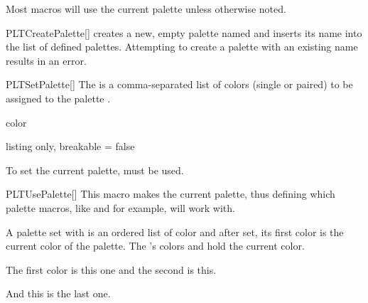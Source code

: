 \documentclass[a4paper, 11pt]{article}
\begin{document}
Most macros will use the current palette unless otherwise noted.

\begin{macro}{PLTCreatePalette}[]
     creates a new, empty palette named  and inserts its name into the list of defined palettes. Attempting to create a palette with an existing name results in an error.
\end{macro}

\begin{macro}{PLTSetPalette}[]
    The  is a comma-separated list of colors (single or paired) to be assigned to the palette .
\end{macro}

\begin{tcolorbox}
    color
\end{tcolorbox}

\begin{example}{listing only, breakable = false}
\end{example}

To set the current palette,  must be used.

\begin{macro}{PLTUsePalette}[]
    This macro makes  the current palette, thus defining which palette macros, like  and  for example, will work with.
\end{macro}

A palette set with  is an ordered list of color and after set, its first color is the current color of the palette. The 's colors  and  hold the current color.

\begin{example}{}

    The first color is \colorbox{PLTBGColor}{\textcolor{PLTFGColor}{this one}} and the second is \PLTNextColor\colorbox{PLTBGColor}{\textcolor{PLTFGColor}{this}}.

    \PLTNextColor
    And \colorbox{PLTBGColor}{\textcolor{PLTFGColor}{this}} is the last one.
\end{example}
\end{document}
